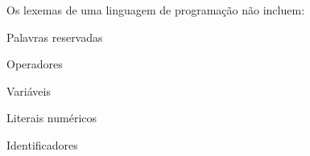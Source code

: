 \question[10]

Os lexemas de uma linguagem de programação não incluem:

\begin{choices}
\item Palavras reservadas
\item Operadores
\item Variáveis %
\item Literais numéricos
\item Identificadores
\end{choices}
\answerline

